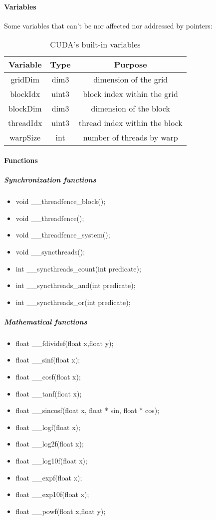 				\paragraph{Variables}

Some variables that can't be nor affected nor addressed by pointers:
\begin{table}[!h]
	\caption{CUDA's built-in variables}
	\center
	\begin{tabular}{|c|c|c|} \hline
	Variable & Type & Purpose \\\hline\hline
	gridDim   & dim3  & dimension of the grid \\\hline
	blockIdx  & uint3 & block index within the grid \\\hline
	blockDim  & dim3  & dimension of the block \\\hline
	threadIdx & uint3 & thread index within the block \\\hline
	warpSize  & int   & number of threads by warp \\\hline
	\end{tabular}
	\label{heterogeneous:tabCudaVariable}
\end{table}

				\paragraph{Functions}

					\subparagraph{Synchronization functions}
					
\begin{itemize}
	\item void \_\_threadfence\_block();
	\item void \_\_threadfence();
	\item void \_\_threadfence\_system();
	\item void \_\_syncthreads();
	\item int \_\_syncthreads\_count(int predicate);
	\item int \_\_syncthreads\_and(int predicate);
	\item int \_\_syncthreads\_or(int predicate);
\end{itemize}

					\subparagraph{Mathematical functions}
					
\begin{itemize}
	\item float \_\_fdividef(float x,float y);
	\item float \_\_sinf(float x);
	\item float \_\_cosf(float x);
	\item float \_\_tanf(float x);
	\item float \_\_sincosf(float x, float * sin, float * cos);
	\item float \_\_logf(float x);
	\item float \_\_log2f(float x);
	\item float \_\_log10f(float x);
	\item float \_\_expf(float x);
	\item float \_\_exp10f(float x);
	\item float \_\_powf(float x,float y);
\end{itemize}

